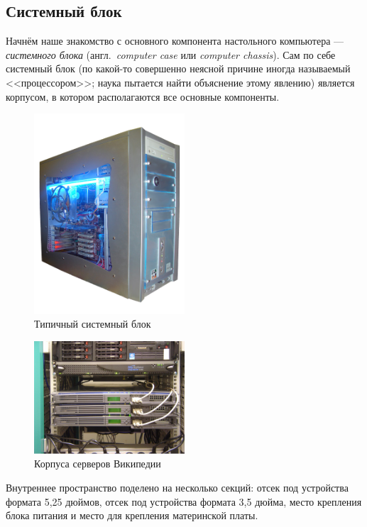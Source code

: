 \subsection{Системный блок}\label{base:introduction:components:case}
Начнём наше знакомство с основного компонента настольного компьютера --- \emph{системного блока} (англ.~\emph{computer case} или \emph{computer chassis}). Сам по себе системный блок (по какой-то совершенно неясной причине иногда называемый <<процессором>>; наука пытается найти объяснение этому явлению) является корпусом, в котором располагаются все основные компоненты.
\begin{figure}[h!]
 \centering
 \includegraphics[width=0.5\textwidth]{base/Introduction/Case.png}
 \caption{Типичный системный блок}
 \label{base:introduction:components:case:typicalcasepic}
\end{figure}
\begin{figure}[h!]
 \centering
 \includegraphics[width=0.5\textwidth]{base/Introduction/Case_wikipedia.jpg}
 \caption{Корпуса серверов Википедии}
 \label{base:introduction:components:case:wikipediacasepic}
\end{figure}
Внутреннее пространство поделено на несколько секций: отсек под устройства формата 5,25 дюймов, отсек под устройства формата 3,5 дюйма, место крепления блока питания и место для крепления материнской платы.

